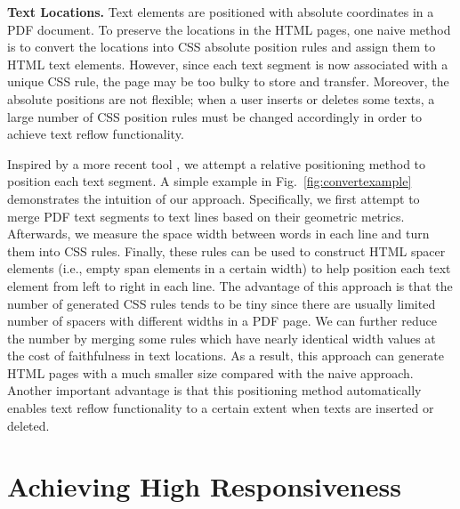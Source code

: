 \documentclass[]{sigchi}
\begin{document}
\textbf{Text Locations.} Text elements are positioned with absolute coordinates in a PDF document. To preserve the locations in the HTML pages, one naive method is to convert the locations into CSS absolute position rules and assign them to HTML text elements. However, since each text segment is now associated with a unique CSS rule, the	page may be too bulky to store and transfer. Moreover, the absolute positions are not flexible; when a user inserts or deletes some texts, 
a large number  of CSS position rules must be changed accordingly in order to achieve text reflow functionality.	

Inspired by a more recent tool \cite{wang2013online}, we attempt a relative positioning method to position each text segment. A simple example in Fig.~\ref{fig:convertexample} demonstrates the intuition of our approach. Specifically, we first attempt to merge PDF text segments to text lines based on their geometric metrics. Afterwards, we measure the space width between words in each line and turn them into CSS rules. Finally, these rules can be used to construct HTML spacer elements (i.e., empty span elements in a certain width) to help position each text element from left to right in each line.
The advantage of this approach is that the number of generated CSS rules tends to be tiny since there are usually limited number of spacers with different widths in a PDF page. We can further reduce the number by merging some rules which have nearly identical width values at the cost of faithfulness in text locations. As a result, this approach can generate HTML pages with a much smaller size compared with the naive approach. 
Another important advantage is that this positioning method automatically enables text reflow functionality to a certain extent when texts are inserted or deleted.  




\section{Achieving High Responsiveness}\label{sect:checkpoint}
\end{document}
